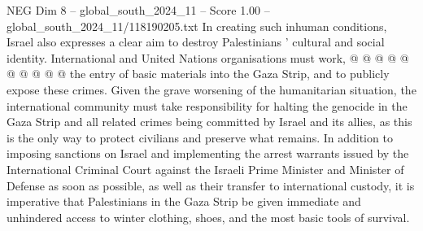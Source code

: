 \begin{textsample}{NEG Dim 8 – global\_south\_2024\_11 – Score 1.00 – global\_south\_2024\_11/118190205.txt}
In creating such inhuman conditions, Israel also expresses a clear aim to destroy Palestinians ' cultural and social identity.
International and United Nations organisations must work, @ @ @ @ @ @ @ @ @ @ the entry of basic materials into the Gaza Strip, and to publicly expose these crimes.
Given the grave worsening of the humanitarian situation, the international community must take responsibility for halting the genocide in the Gaza Strip and all related crimes being committed by Israel and its allies, as this is the only way to protect civilians and preserve what remains.
In addition to imposing sanctions on Israel and implementing the arrest warrants issued by the International Criminal Court against the Israeli Prime Minister and Minister of Defense as soon as possible, as well as their transfer to international custody, it is imperative that Palestinians in the Gaza Strip be given immediate and unhindered access to winter clothing, shoes, and the most basic tools of survival.

\end{textsample}
